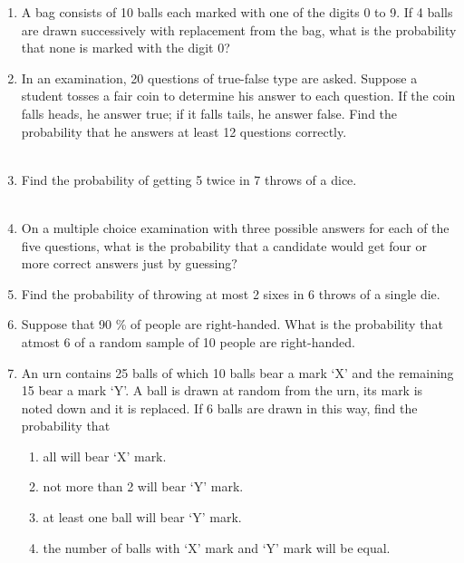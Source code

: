 \begin{enumerate}[label=\thesection.\arabic*,ref=\thesection.\theenumi]

\item A bag consists of 10 balls each marked with one of the digits 0 to 9. If 4 balls are drawn successively with replacement from the bag, what is the probability that none is marked with the digit 0?
\\
\solution

\item In an examination, 20 questions of true-false type are asked. Suppose a student tosses a fair coin to determine his answer to each question. If the coin falls heads, he answer true; if it falls tails, he answer false. Find the probability that he answers at least 12 questions correctly.\\
\\
\solution

\item Find the probability of getting 5 twice in 7 throws of a dice.\\
\\
\solution

\item On a multiple choice examination with three possible answers for each of the five questions, what is the probability that a candidate would get four or more correct answers just by guessing$?$
\\
\solution

\item Find the probability of throwing at most 2 sixes in 6 throws of a single die.\\
\solution

\item Suppose that 90 \% of people are right-handed. What is the probability that atmost 6 of a random sample of 10 people are right-handed. 
	\\
\solution

  \item An urn contains 25 balls of which 10 balls bear a mark `X' and the 
    remaining 15 bear a mark `Y'. A ball is drawn at random from the urn, its 
    mark is noted down and it is replaced. If 6 balls are drawn in this way, 
    find the probability that 
    \begin{enumerate}
        \item all will bear `X' mark. 
        \item not more than 2 will bear `Y' mark. 
        \item at least one ball will bear `Y' mark. 
        \item the number of balls with `X' mark and `Y' mark will be equal.
    \end{enumerate}
\solution



\end{enumerate}

